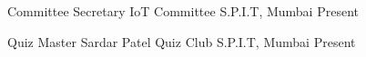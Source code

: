 

\begin{cvhonors}

  \cvhonor
    {Committee Secretary} %
    {IoT Committee} %
    {S.P.I.T, Mumbai} %
    {Present} %

  \cvhonor
    {Quiz Master} %
    {Sardar Patel Quiz Club} %
    {S.P.I.T, Mumbai} %
    {Present} %

\end{cvhonors}
